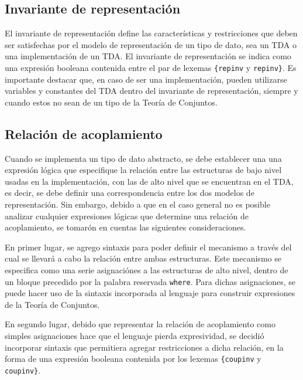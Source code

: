 \subsection{Invariante de representación}
El invariante de representación define las características y restricciones que
deben ser satisfechas por el modelo de representación de un tipo de dato, sea un
TDA o una implementación de un TDA. El invariante de representación se indica
como una expresión booleana contenida entre el par de lexemas
\texttt{\{repinv} y \texttt{repinv\}}. Es importante destacar que, en caso de
ser una implementación, pueden utilizarse variables y constantes del TDA
dentro del invariante de representación, siempre y cuando estos no sean de un
tipo de la Teoría de Conjuntos.

\subsection{Relación de acoplamiento}

Cuando se implementa un tipo de dato abstracto, se debe establecer una una
expresión lógica que especifique la relación entre las estructuras de bajo
nivel usadas en la implementación, con las de alto nivel que se encuentran en
el TDA, es decir, se debe definir una correspondencia entre los dos modelos de
representación. Sin embargo, debido a que en el caso general no es posible
analizar cualquier expresiones lógicas que determine una relación de
acoplamiento, se tomarón en cuentas las siguientes consideraciones.

En primer lugar, se agrego sintaxis para poder definir el mecanismo a través
del cual se llevará a cabo la relación entre ambas estructuras. Este mecanismo
se especifica como una serie asignaciónes a las estructuras de alto nivel,
dentro de un bloque precedido por la palabra reservada \texttt{where}. Para
dichas asignaciones, se puede hacer uso de la sintaxis incorporada al lenguaje
para construir expresiones de la Teoría de Conjuntos.

En segundo lugar, debido que representar la relación de acoplamiento como
simples asignaciones hace que el lenguaje pierda expresividad, se decidió
incorporar sintaxis que permitiera agregar restricciones a dicha relación, en
la forma de una expresión booleana contenida por los lexemas
\texttt{\{coupinv} y \texttt{coupinv\}}.




